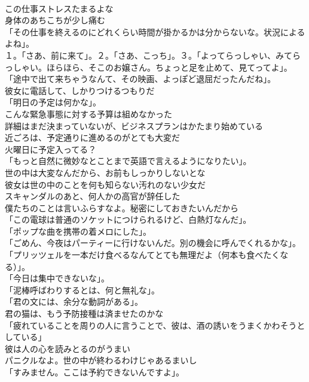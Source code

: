 \documentclass[8pt]{extreport}
\begin{document}
\begin{CJK}{UTF8}{min}
\\	この仕事ストレスたまるよな	
\\	身体のあちこちが少し痛む	
\\	「その仕事を終えるのにどれくらい時間が掛かるかは分からないな。状況によるよね」。	
\\	１。「さあ、前に来て」。２。「さあ、こっち」。３。「よってらっしゃい、みてらっしゃい。ほらほら、そこのお嬢さん。ちょっと足を止めて、見てってよ」。	
\\	「途中で出て来ちゃうなんて、その映画、よっぽど退屈だったんだね」。	
\\	彼女に電話して、しかりつけるつもりだ	
\\	「明日の予定は何かな」。	
\\	こんな緊急事態に対する予算は組めなかった	
\\	詳細はまだ決まっていないが、ビジネスプランはかたまり始めている	
\\	近ごろは、予定通りに進めるのがとても大変だ	
\\	火曜日に予定入ってる？	
\\	「もっと自然に微妙なとことまで英語で言えるようになりたい」。	
\\	世の中は大変なんだから、お前もしっかりしないとな	
\\	彼女は世の中のことを何も知らない汚れのない少女だ	
\\	スキャンダルのあと、何人かの高官が辞任した	
\\	僕たちのことは言いふらすなよ。秘密にしておきたいんだから	
\\	「この電球は普通のソケットにつけられるけど、白熱灯なんだ」。	
\\	「ポップな曲を携帯の着メロにした」。	
\\	「ごめん、今夜はパーティーに行けないんだ。別の機会に呼んでくれるかな」。	
\\	「プリッツェルを一本だけ食べるなんてとても無理だよ（何本も食べたくなる）」。	
\\	「今日は集中できないな」。	
\\	「泥棒呼ばわりするとは、何と無礼な」。	
\\	「君の文には、余分な動詞がある」。	
\\	君の猫は、もう予防接種は済ませたのかな	
\\	「疲れていることを周りの人に言うことで、彼は、酒の誘いをうまくかわそうとしている」	
\\	彼は人の心を読みとるのがうまい	
\\	パニクルなよ。世の中が終わるわけじゃあるまいし	
\\	「すみません。ここは予約できないんですよ」。	

\end{CJK}
\end{document}
